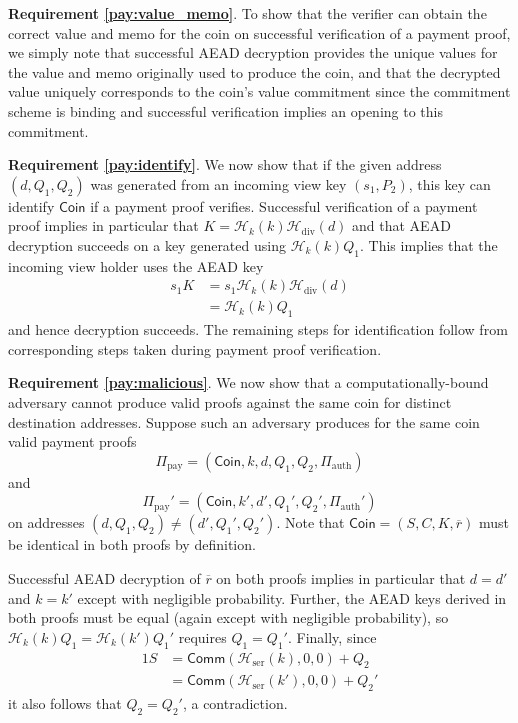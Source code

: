 \documentclass{llncs}
\newcommand{\hash}{\mathcal{H}}
\newcommand{\func}[1]{\mathsf{#1}}
\newcommand{\comm}{\func{Comm}}
\begin{document}
\textbf{Requirement \ref{pay:value_memo}}. To show that the verifier can obtain the correct value and memo for the coin on successful verification of a payment proof, we simply note that successful AEAD decryption provides the unique values for the value and memo originally used to produce the coin, and that the decrypted value uniquely corresponds to the coin's value commitment since the commitment scheme is binding and successful verification implies an opening to this commitment.

\textbf{Requirement \ref{pay:identify}}. We now show that if the given address $(d,Q_1,Q_2)$ was generated from an incoming view key $(s_1,P_2)$, this key can identify $\textsf{Coin}$ if a payment proof verifies.
Successful verification of a payment proof implies in particular that $K = \hash_k(k)\hash_{\text{div}}(d)$ and that AEAD decryption succeeds on a key generated using $\hash_k(k) Q_1$.
This implies that the incoming view holder uses the AEAD key
\begin{align*}
    s_1 K &= s_1 \hash_k(k)\hash_{\text{div}}(d) \\
    &= \hash_k(k) Q_1
\end{align*}
and hence decryption succeeds.
The remaining steps for identification follow from corresponding steps taken during payment proof verification.

\textbf{Requirement \ref{pay:malicious}}. We now show that a computationally-bound adversary cannot produce valid proofs against the same coin for distinct destination addresses.
Suppose such an adversary produces for the same coin valid payment proofs
$$\Pi_{\text{pay}} = (\mathsf{Coin},k,d,Q_1,Q_2,\Pi_{\text{auth}})$$
and
$$\Pi_{\text{pay}}' = (\mathsf{Coin},k',d',Q_1',Q_2',\Pi_{\text{auth}}')$$
on addresses $(d,Q_1,Q_2) \neq (d',Q_1',Q_2')$.
Note that $\mathsf{Coin} = (S,C,K,\overline{r})$ must be identical in both proofs by definition.

Successful AEAD decryption of $\overline{r}$ on both proofs implies in particular that $d = d'$ and $k = k'$ except with negligible probability.
Further, the AEAD keys derived in both proofs must be equal (again except with negligible probability), so $\hash_k(k) Q_1 = \hash_k(k') Q_1'$ requires $Q_1 = Q_1'$.
Finally, since
\begin{alignat*}{1}
    S &= \comm(\hash_{\text{ser}}(k),0,0) + Q_2 \\    
    &= \comm(\hash_{\text{ser}}(k'),0,0) + Q_2'
\end{alignat*}
it also follows that $Q_2 = Q_2'$, a contradiction.
\end{document}
